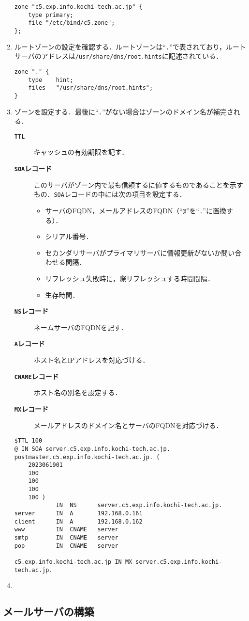 \begin{enumerate}
\begin{lstlisting}[style=file,caption={\ttfamily /etc/bind/named.conf.local}]
zone "c5.exp.info.kochi-tech.ac.jp" {
    type primary;
    file "/etc/bind/c5.zone";
};
    \end{lstlisting}
    \item ルートゾーンの設定を確認する．ルートゾーンは``\texttt{.}''で表されており，ルートサーバのアドレスは\texttt{/usr/share/dns/root.hints}に記述されている．
          \begin{lstlisting}[caption={\ttfamily /etc/bind/named.conf.default-zones},style=file]
zone "." {
    type    hint;
    files   "/usr/share/dns/root.hints";
}
    \end{lstlisting}
    \item ゾーンを設定する．最後に``\texttt{.}''がない場合はゾーンのドメイン名が補完される．
          \begin{description}
              \item[\bfseries\texttt{TTL}] キャッシュの有効期限を記す．
              \item[\bfseries\texttt{SOA}レコード] このサーバがゾーン内で最も信頼するに値するものであることを示すもの．\texttt{SOA}レコードの中には次の項目を設定する．
                  \begin{itemize}
                      \item サーバのFQDN，メールアドレスのFQDN（``\texttt{@}''を``\texttt{.}''に置換する）．
                      \item シリアル番号．
                      \item セカンダリサーバがプライマリサーバに情報更新がないか問い合わせる間隔．
                      \item リフレッシュ失敗時に，際リフレッシュする時間間隔．
                      \item 生存時間．
                  \end{itemize}
              \item[\bfseries\texttt{NS}レコード] ネームサーバのFQDNを記す．
              \item[\bfseries\texttt{A}レコード]  ホスト名とIPアドレスを対応づける．
              \item[\bfseries\texttt{CNAME}レコード] ホスト名の別名を設定する．
              \item[\bfseries\texttt{MX}レコード] メールアドレスのドメイン名とサーバのFQDNを対応づける．\hfill\cite[p.69\ -\ p.71]{DNSBIND}
          \end{description}
          \begin{lstlisting}[style=file,caption={\ttfamily /etc/bind/c5.zone}]
$TTL 100
@ IN SOA server.c5.exp.info.kochi-tech.ac.jp. postmaster.c5.exp.info.kochi-tech.ac.jp. (
    2023061901
    100
    100
    100
    100 )
            IN  NS      server.c5.exp.info.kochi-tech.ac.jp.
server      IN  A       192.168.0.161
client      IN  A       192.168.0.162
www         IN  CNAME   server
smtp        IN  CNAME   server
pop         IN  CNAME   server

c5.exp.info.kochi-tech.ac.jp IN MX server.c5.exp.info.kochi-tech.ac.jp.
    \end{lstlisting}
    \item
\end{enumerate}
\subsection{メールサーバの構築}